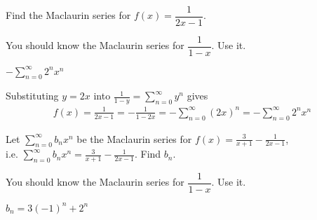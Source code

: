 
\begin{Mquestion}[M105 2013A]\label{prob_s3.6modify1}
Find the Maclaurin series for $f(x) = \dfrac{1}{2x-1}$.
\end{Mquestion}

\begin{hint}
You should know the Maclaurin series for $\dfrac{1}{1-x}$. Use it.
\end{hint}

\begin{answer}
$\displaystyle-\sum\limits_{n=0}^\infty 2^nx^n$
\end{answer}

\begin{solution}
Substituting $y=2x$ into $\displaystyle \frac{1}{1-y} = \sum\limits_{n=0}^\infty y^n$
gives
\begin{align*}
f(x) = \frac{1}{2x-1} = -\frac{1}{1-2x}
=-\sum_{n=0}^\infty (2x)^n
=-\sum_{n=0}^\infty 2^nx^n
\end{align*}
\end{solution}

\begin{question}[M105 2014A]
Let $\displaystyle\sum\limits_{n=0}^\infty b_nx^n$
be the Maclaurin series for $\displaystyle f(x) = \frac{3}{x+1} - \frac{1}{2x-1}$,\\
i.e. $\displaystyle\sum\limits_{n=0}^\infty b_nx^n = \frac{3}{x+1} - \frac{1}{2x-1}$.
Find $b_n$.
\end{question}

\begin{hint}
You should know the Maclaurin series for $\dfrac{1}{1-x}$. Use it.
\end{hint}

\begin{answer}
$b_n = 3(-1)^n + 2^n$
\end{answer}

